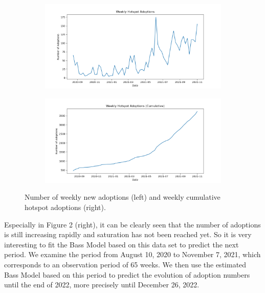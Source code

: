 \documentclass{article}
\begin{document}
\begin{figure}[!hptb]
    \begin{subfigure}[h]{0.52\linewidth}
    \includegraphics[width=\linewidth]{plots/weekly_hotspot_adoptions.png}
    \end{subfigure}
    \hfill
    \begin{subfigure}[h]{0.52\linewidth}
    \includegraphics[width=\linewidth]{plots/weekly_hotspot_adoptions_cumulative.png}
    \end{subfigure}%
    \caption{Number of weekly new adoptions (left) and weekly cumulative hotspot adoptions (right).}
    \end{figure}


\noindent Especially in Figure 2 (right), it can be clearly seen that the number of adoptions is still increasing rapidly and saturation has not been reached yet.
So it is very interesting to fit the Bass Model based on this data set to predict the next period. We examine the period from August 10, 2020 to November 7, 2021,
which corresponds to an observation period of 65 weeks. We then use the estimated Bass Model based on this period to predict the evolution of adoption numbers until
the end of 2022, more precisely until December 26, 2022.

\bigskip
\end{document}
